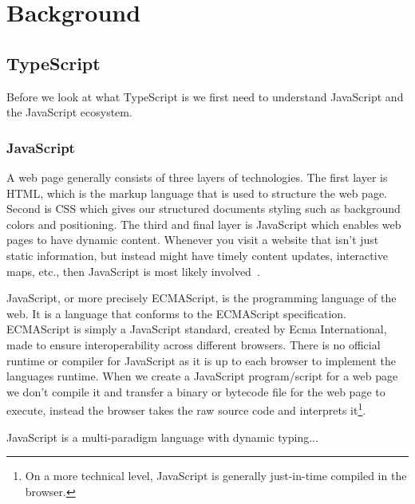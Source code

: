 
\chapter{Background}\label{ch:background}



\section{TypeScript}\label{sec:typescript}

Before we look at what TypeScript is we first need to understand JavaScript and the JavaScript ecosystem.

\subsection{JavaScript}\label{subsec:javascript}


A web page generally consists of three layers of technologies.
The first layer is HTML, which is the markup language that is used to structure the web page.
Second is CSS which gives our structured documents styling such as background colors and positioning.
The third and final layer is JavaScript which enables web pages to have dynamic content.
Whenever you visit a website that isn't just static information, but instead might have timely content updates, interactive maps, etc., then JavaScript is most likely involved~\cite{whatisjs}.

JavaScript, or more precisely ECMAScript, is the programming language of the web.
It is a language that conforms to the ECMAScript specification.
ECMAScript is simply a JavaScript standard, created by Ecma International, made to ensure interoperability across different browsers.
There is no official runtime or compiler for JavaScript as it is up to each browser to implement the languages runtime.
When we create a JavaScript program/script for a web page we don't compile it and transfer a binary or bytecode file for the web page to execute, instead the browser takes the raw source code and interprets it\footnote{On a more technical level, JavaScript is generally just-in-time compiled in the browser.}.

JavaScript is a multi-paradigm language with dynamic typing...


